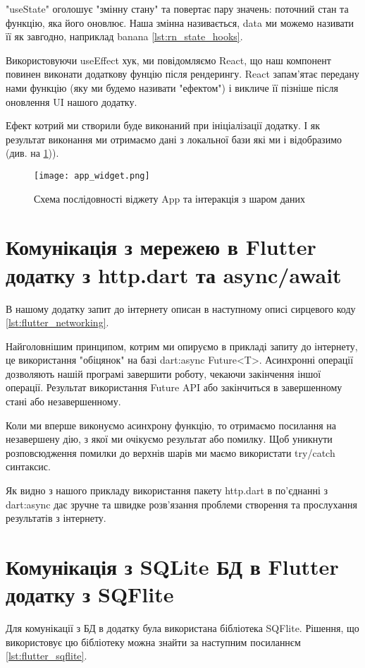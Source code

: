 "useState" оголошує "змінну стану" та повертає пару значень: поточний стан та функцію, яка його оновлює.
Наша змінна називається, data ми можемо називати її як завгодно, наприклад banana \ref{lst:rn_state_hooks}.

Використовуючи useEffect хук, ми повідомляємо React, що наш компонент повинен виконати додаткову фунцію після рендерингу.
React запам'ятає передану нами функцію (яку ми будемо називати "ефектом") і викличе її пізніше після оновлення UI нашого додатку.

Ефект котрий ми створили буде виконаний при ініціалізації додатку. І як результат виконання ми отримаємо дані з локальної бази які ми і відобразимо (див. на \ref{fig:rn_realm})).

\begin{figure}
    \begin{center}
        \texttt{[image: app\_widget.png]}
        \caption{Схема послідовності віджету App та інтеракція з шаром даних}
        \label{fig:rn_realm}
    \end{center}
\end{figure}


\section{Комунікація з мережею в Flutter додатку з http.dart та async/await}
\label{section.2.5}
В нашому додатку запит до інтернету описан в наступному описі сирцевого коду \ref{lst:flutter_networking}.

Найголовнішим принципом, котрим ми опируємо в прикладі запиту до інтернету, це використання "обіцянок" на базі dart:async Future<T>.
Асинхронні операції дозволяють нашій програмі завершити роботу, чекаючи закінчення іншої операції.
Результат використання Future API або закінчиться в завершенному стані або незавершенному.

Коли ми вперше виконуємо асинхрону функцію, то отримаємо посилання на незавершену дію, з якої ми очікуємо результат або помилку.
Щоб уникнути розповсюдження помилки до верхнів шарів ми маємо використати try/catch синтаксис.

Як видно з нашого прикладу використання пакету http.dart в по'єднанні з dart:async дає зручне
та швидке розв'язання проблеми створення та прослухання результатів з інтернету.


\section{Комунікація з SQLite БД в Flutter додатку з SQFlite}
\label{section.2.6}
Для комунікації з БД в додатку була використана бібліотека SQFlite.
Рішення, що використовує цю бібліотеку можна знайти за наступним посиланнєм \ref{lst:flutter_sqflite}.

